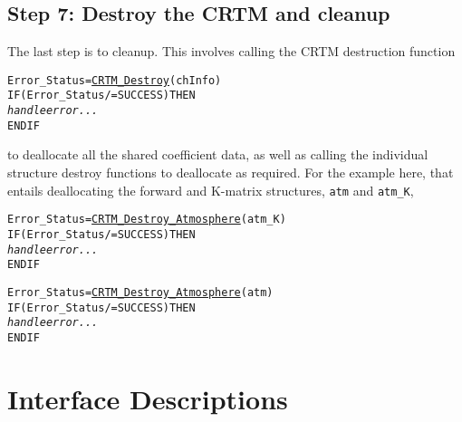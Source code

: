 \subsection{Step 7: Destroy the CRTM and cleanup}
The last step is to cleanup. This involves calling the CRTM destruction function
\begin{alltt}
  Error_Status = \hyperref[sec:CRTM_Destroy_interface]{CRTM_Destroy}( chInfo )
  IF ( Error_Status /= SUCCESS ) THEN 
    \textrm{\textit{handle error...}}
  END IF\end{alltt}
to deallocate all the shared coefficient data, as well as calling the individual structure destroy functions to deallocate as required. For the example here, that entails deallocating the forward and K-matrix \hyperref[sec:atmosphere_structure]{\Atmosphere}  structures, \texttt{atm} and \texttt{atm\_K},
\begin{alltt}
  Error_Status = \hyperref[sec:CRTM_Destroy_Atmosphere_interface]{CRTM_Destroy_Atmosphere}(atm_K)
  IF ( Error_Status /= SUCCESS ) THEN 
    \textrm{\textit{handle error...}}
  END IF
  
  Error_Status = \hyperref[sec:CRTM_Destroy_Atmosphere_interface]{CRTM_Destroy_Atmosphere}(atm)
  IF ( Error_Status /= SUCCESS ) THEN 
    \textrm{\textit{handle error...}}
  END IF\end{alltt}


\section{Interface Descriptions}









